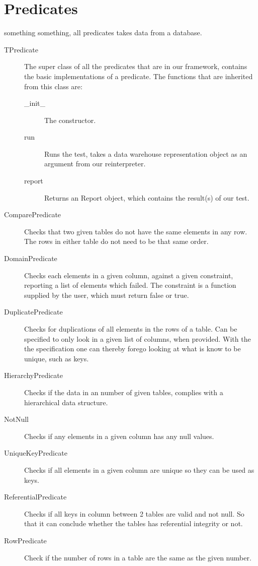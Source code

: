 \section{Predicates}
something something, all predicates takes data from a database.

\begin{description}
\item [TPredicate] The super class of all the predicates that are in our framework, contains the basic implementations of a predicate. The functions that are inherited from this class are:
	\begin{description}
	\item [\_init\_ ] The constructor. 
	\item [run] Runs the test, takes a data warehouse representation object as an argument from our reinterpreter. 
	\item [report] Returns an Report object, which contains the result(s) of our test.
	\end{description}
\item [ComparePredicate] Checks that two given tables do not have the same elements in any row. The rows in either table do not need to be that same order.
\item [DomainPredicate] Checks each elements in a given column, against a given constraint, reporting a list of elements which failed. The constraint is a function supplied by the user, which must return false or true.
\item [DuplicatePredicate] Checks for duplications of all elements in the rows of a table. Can be specified to only look in a given list of columns, when provided. With the the specification one can thereby forego looking at what is know to be unique, such as keys.
\item [HierarchyPredicate] Checks if the data in an number of given tables, complies with a hierarchical data structure.
\item [NotNull] Checks if any elements in a given column has any null values.
\item [UniqueKeyPredicate] Checks if all elements in a given column are unique so they can be used as keys.
\item [ReferentialPredicate] Checks if all keys in column between 2 tables are valid and not null. So that it can conclude whether the tables has referential integrity or not.
\item [RowPredicate] Check if the number of rows in a table are the same as the given number.
\end{description}